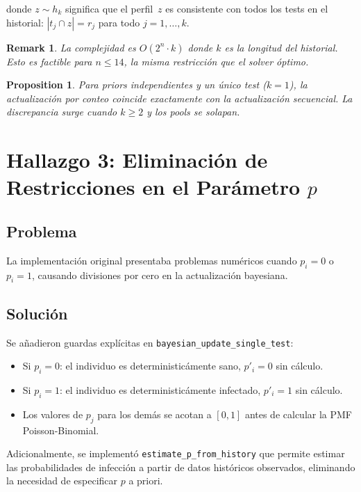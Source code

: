 \documentclass[11pt, a4paper]{article}
\newtheorem{proposition}{Proposition}
\newtheorem{remark}{Remark}
\begin{document}
donde $z \sim h_k$ significa que el perfil~$z$ es consistente con todos los
tests en el historial: $|t_j \cap z| = r_j$ para todo $j = 1, \ldots, k$.

\begin{remark}
La complejidad es $O(2^n \cdot k)$ donde $k$ es la longitud del historial.
Esto es factible para $n \leq 14$, la misma restricci\'on que el solver \'optimo.
\end{remark}

\begin{proposition}
Para priors independientes y un \'unico test ($k=1$), la actualizaci\'on
por conteo coincide exactamente con la actualizaci\'on secuencial. La
discrepancia surge cuando $k \geq 2$ y los pools se solapan.
\end{proposition}

\section{Hallazgo 3: Eliminaci\'on de Restricciones en el Par\'ametro $p$}

\subsection{Problema}
La implementaci\'on original presentaba problemas num\'ericos cuando
$p_i = 0$ o $p_i = 1$, causando divisiones por cero en la actualizaci\'on
bayesiana.

\subsection{Soluci\'on}
Se a\~nadieron guardas expl\'icitas en \texttt{bayesian\_update\_single\_test}:
\begin{itemize}[nosep]
    \item Si $p_i = 0$: el individuo es deterministic\'amente sano,
    $p'_i = 0$ sin c\'alculo.
    \item Si $p_i = 1$: el individuo es deterministic\'amente infectado,
    $p'_i = 1$ sin c\'alculo.
    \item Los valores de $p_j$ para los dem\'as se acotan a $[0, 1]$ antes
    de calcular la PMF Poisson-Binomial.
\end{itemize}

Adicionalmente, se implement\'o \texttt{estimate\_p\_from\_history} que permite
estimar las probabilidades de infecci\'on a partir de datos hist\'oricos observados,
eliminando la necesidad de especificar $p$ a priori.
\end{document}
